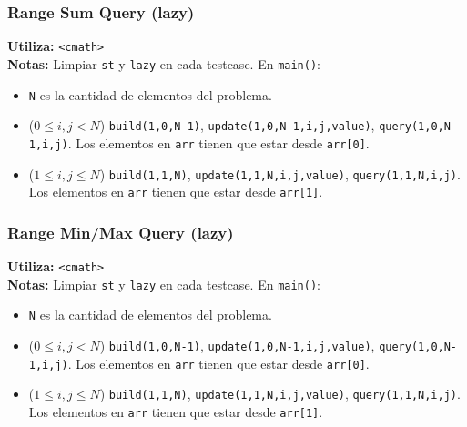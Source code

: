 \subsubsection{Range Sum Query (lazy)}
\begin{footnotesize}
	\textbf{Utiliza:} \texttt{<cmath>}\\
	\textbf{Notas:} Limpiar \texttt{st} y \texttt{lazy} en cada testcase. En \texttt{main()}: \\
	\begin{itemize}
		\item \texttt{N} es la cantidad de elementos del problema.
		\item ($ 0 \leq i,j < N $) \texttt{build(1,0,N-1)}, \texttt{update(1,0,N-1,i,j,value)}, \texttt{query(1,0,N-1,i,j)}. Los elementos en \texttt{arr} tienen que estar desde \texttt{arr[0]}.
		\item ($ 1 \leq i,j \leq N $) \texttt{build(1,1,N)}, \texttt{update(1,1,N,i,j,value)}, \texttt{query(1,1,N,i,j)}. Los elementos en \texttt{arr} tienen que estar desde \texttt{arr[1]}.
	\end{itemize}
\end{footnotesize}


\subsubsection{Range Min/Max Query (lazy)}
\begin{footnotesize}
	\textbf{Utiliza:} \texttt{<cmath>}\\
	\textbf{Notas:} Limpiar \texttt{st} y \texttt{lazy} en cada testcase. En \texttt{main()}: \\
	\begin{itemize}
		\item \texttt{N} es la cantidad de elementos del problema.
		\item ($ 0 \leq i,j < N $) \texttt{build(1,0,N-1)}, \texttt{update(1,0,N-1,i,j,value)}, \texttt{query(1,0,N-1,i,j)}. Los elementos en \texttt{arr} tienen que estar desde \texttt{arr[0]}.
		\item ($ 1 \leq i,j \leq N $) \texttt{build(1,1,N)}, \texttt{update(1,1,N,i,j,value)}, \texttt{query(1,1,N,i,j)}. Los elementos en \texttt{arr} tienen que estar desde \texttt{arr[1]}.
	\end{itemize}
\end{footnotesize}


